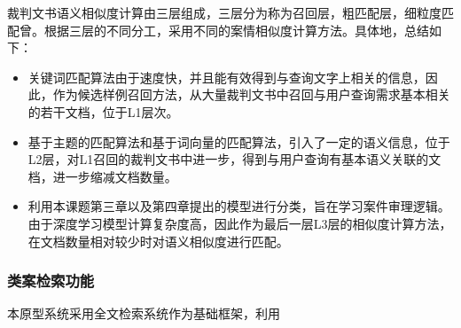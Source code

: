 裁判文书语义相似度计算由三层组成，三层分为称为召回层，粗匹配层，细粒度匹配曾。根据三层的不同分工，采用不同的案情相似度计算方法。具体地，总结如下：
\begin{itemize}
    \item 关键词匹配算法由于速度快，并且能有效得到与查询文字上相关的信息，因此，作为候选样例召回方法，从大量裁判文书中召回与用户查询需求基本相关的若干文档，位于L1层次。
    \item 基于主题的匹配算法和基于词向量的匹配算法，引入了一定的语义信息，位于L2层，对L1召回的裁判文书中进一步，得到与用户查询有基本语义关联的文档，进一步缩减文档数量。
    \item 利用本课题第三章以及第四章提出的模型进行分类，旨在学习案件审理逻辑。由于深度学习模型计算复杂度高，因此作为最后一层L3层的相似度计算方法，在文档数量相对较少时对语义相似度进行匹配。
\end{itemize}





\subsubsection{类案检索功能}
本原型系统采用全文检索系统作为基础框架，利用



